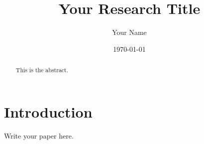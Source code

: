 \documentclass{article}
\title{Your Research Title}
\author{Your Name}
\date{\today}
\begin{document}
\maketitle

\begin{abstract}
This is the abstract.
\end{abstract}

\section{Introduction}
Write your paper here.



\end{document}
